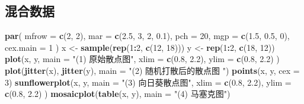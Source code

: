 \documentclass[
  b5paper,
  UTF8,twoside]{book}
\newenvironment{Shaded}{\begin{snugshade}}{\end{snugshade}}
\newcommand{\AttributeTok}[1]{\textcolor[rgb]{0.13,0.29,0.53}{#1}}
\newcommand{\DecValTok}[1]{\textcolor[rgb]{0.00,0.00,0.81}{#1}}
\newcommand{\FloatTok}[1]{\textcolor[rgb]{0.00,0.00,0.81}{#1}}
\newcommand{\FunctionTok}[1]{\textcolor[rgb]{0.13,0.29,0.53}{\textbf{#1}}}
\newcommand{\NormalTok}[1]{#1}
\newcommand{\OtherTok}[1]{\textcolor[rgb]{0.56,0.35,0.01}{#1}}
\newcommand{\SpecialCharTok}[1]{\textcolor[rgb]{0.81,0.36,0.00}{\textbf{#1}}}
\newcommand{\StringTok}[1]{\textcolor[rgb]{0.31,0.60,0.02}{#1}}
\begin{document}
\subsection{混合数据}\label{ux6df7ux5408ux6570ux636e}

\begin{Shaded}
\begin{Highlighting}[]
\FunctionTok{par}\NormalTok{(}
  \AttributeTok{mfrow =} \FunctionTok{c}\NormalTok{(}\DecValTok{2}\NormalTok{, }\DecValTok{2}\NormalTok{), }\AttributeTok{mar =} \FunctionTok{c}\NormalTok{(}\FloatTok{2.5}\NormalTok{, }\DecValTok{3}\NormalTok{, }\DecValTok{2}\NormalTok{, }\FloatTok{0.1}\NormalTok{), }\AttributeTok{pch =} \DecValTok{20}\NormalTok{,}
  \AttributeTok{mgp =} \FunctionTok{c}\NormalTok{(}\FloatTok{1.5}\NormalTok{, }\FloatTok{0.5}\NormalTok{, }\DecValTok{0}\NormalTok{), }\AttributeTok{cex.main =} \DecValTok{1}
\NormalTok{)}
\NormalTok{x }\OtherTok{\textless{}{-}} \FunctionTok{sample}\NormalTok{(}\FunctionTok{rep}\NormalTok{(}\DecValTok{1}\SpecialCharTok{:}\DecValTok{2}\NormalTok{, }\FunctionTok{c}\NormalTok{(}\DecValTok{12}\NormalTok{, }\DecValTok{18}\NormalTok{)))}
\NormalTok{y }\OtherTok{\textless{}{-}} \FunctionTok{rep}\NormalTok{(}\DecValTok{1}\SpecialCharTok{:}\DecValTok{2}\NormalTok{, }\FunctionTok{c}\NormalTok{(}\DecValTok{18}\NormalTok{, }\DecValTok{12}\NormalTok{))}
\FunctionTok{plot}\NormalTok{(x, y,}
  \AttributeTok{main =} \StringTok{"(1) 原始散点图"}\NormalTok{, }\AttributeTok{xlim =} \FunctionTok{c}\NormalTok{(}\FloatTok{0.8}\NormalTok{, }\FloatTok{2.2}\NormalTok{),}
  \AttributeTok{ylim =} \FunctionTok{c}\NormalTok{(}\FloatTok{0.8}\NormalTok{, }\FloatTok{2.2}\NormalTok{)}
\NormalTok{)}
\FunctionTok{plot}\NormalTok{(}\FunctionTok{jitter}\NormalTok{(x), }\FunctionTok{jitter}\NormalTok{(y), }\AttributeTok{main =} \StringTok{"(2) 随机打散后的散点图 "}\NormalTok{)}
\FunctionTok{points}\NormalTok{(x, y, }\AttributeTok{cex =} \DecValTok{3}\NormalTok{)}
\FunctionTok{sunflowerplot}\NormalTok{(x, y,}
  \AttributeTok{main =} \StringTok{"(3) 向日葵散点图"}\NormalTok{,}
  \AttributeTok{xlim =} \FunctionTok{c}\NormalTok{(}\FloatTok{0.8}\NormalTok{, }\FloatTok{2.2}\NormalTok{), }\AttributeTok{ylim =} \FunctionTok{c}\NormalTok{(}\FloatTok{0.8}\NormalTok{, }\FloatTok{2.2}\NormalTok{)}
\NormalTok{)}
\FunctionTok{mosaicplot}\NormalTok{(}\FunctionTok{table}\NormalTok{(x, y), }\AttributeTok{main =} \StringTok{"(4) 马塞克图"}\NormalTok{)}
\end{Highlighting}
\end{Shaded}
\end{document}
